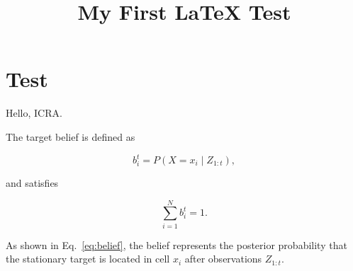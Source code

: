\documentclass{article}
\title{My First LaTeX Test}
\author{}
\date{}
\begin{document}
\maketitle

\section{Test}

Hello, ICRA.

The target belief is defined as

\begin{equation}
    b_i^t = P(X = x_i \mid Z_{1:t}),
    \label{eq:belief}
\end{equation}

and satisfies

\begin{equation}
    \sum_{i=1}^{N} b_i^t = 1.
\end{equation}

As shown in Eq.~\eqref{eq:belief}, the belief represents the
posterior probability that the stationary target is located in cell
$x_i$ after observations $Z_{1:t}$.
\end{document}
